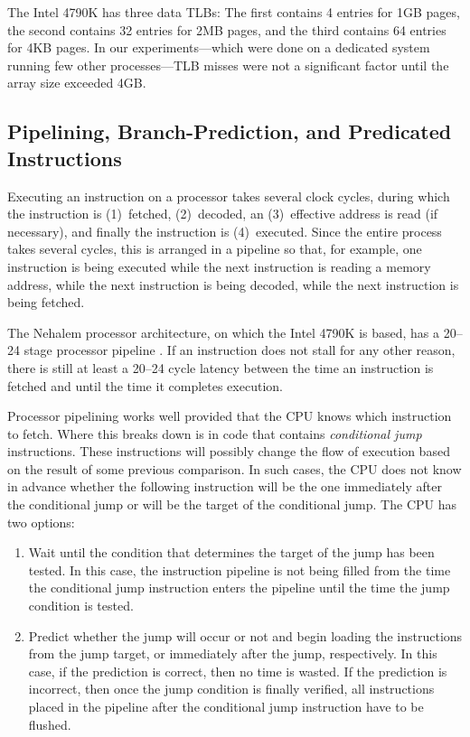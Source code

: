 \documentclass{patmorin}
\begin{document}
The Intel 4790K has three data TLBs: The first contains 4 entries for
1GB pages, the second contains 32 entries for 2MB pages, and the third
contains 64 entries for 4KB pages.  In our experiments---which were done
on a dedicated system running few other processes---TLB misses were not
a significant factor until the array size exceeded 4GB.


\subsection{Pipelining, Branch-Prediction, and Predicated Instructions}

Executing an instruction on a processor takes several clock cycles, during
which the instruction is (1)~fetched, (2)~decoded, an (3)~effective
address is read (if necessary), and finally the instruction is
(4)~executed.  Since the entire process takes several cycles, this
is arranged in a pipeline so that, for example, one instruction is being
executed while the next instruction is reading a memory address, while
the next instruction is being decoded, while the next instruction is
being fetched.

The Nehalem processor architecture, on which the Intel 4790K is based, has
a 20--24 stage processor pipeline \cite{bit-tech:intel}. If an instruction
does not stall for any other reason, there is still at least a 20--24
cycle latency between the time an instruction is fetched and until the
time it completes execution.

Processor pipelining works well provided that the CPU knows which
instruction to fetch.  Where this breaks down is in code that contains
\emph{conditional jump} instructions. These instructions will possibly
change the flow of execution based on the result of some previous
comparison.  In such cases, the CPU does not know in advance whether the
following instruction will be the one immediately after the conditional
jump or will be the target of the conditional jump. The CPU has two
options:
\begin{enumerate}
  \item Wait until the condition that determines the target
   of the jump has been tested. In this case, the instruction pipeline
   is not being filled from the time the conditional jump instruction
   enters the pipeline until the time the jump condition is tested.

  \item Predict whether the jump will occur or not and begin loading
  the instructions from the jump target, or immediately after the jump,
  respectively.  In this case, if the prediction is correct, then no
  time is wasted. If the prediction is incorrect, then once the jump
  condition is finally verified, all instructions placed in the pipeline
  after the conditional jump instruction have to be flushed.
\end{enumerate}
\end{document}
